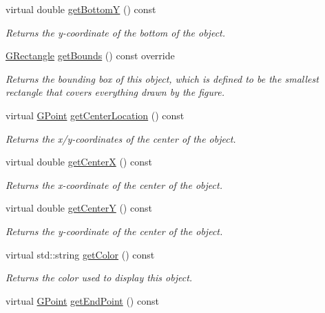 \begin{DoxyCompactItemize}
virtual double \mbox{\hyperlink{classsgl_1_1GObject_a4316a2406c18e1c6d061fe51fd355490}{get\+BottomY}} () const
\begin{DoxyCompactList}\small\item\em Returns the {\itshape y}-\/coordinate of the bottom of the object. \end{DoxyCompactList}\item 
\mbox{\hyperlink{structsgl_1_1GRectangle}{G\+Rectangle}} \mbox{\hyperlink{classsgl_1_1GArc_a89040ce9277825772d359fccd33bca86}{get\+Bounds}} () const override
\begin{DoxyCompactList}\small\item\em Returns the bounding box of this object, which is defined to be the smallest rectangle that covers everything drawn by the figure. \end{DoxyCompactList}\item 
virtual \mbox{\hyperlink{structsgl_1_1GPoint}{G\+Point}} \mbox{\hyperlink{classsgl_1_1GObject_a0909472e91448470bccdb62ecfb95d8b}{get\+Center\+Location}} () const
\begin{DoxyCompactList}\small\item\em Returns the x/y-\/coordinates of the center of the object. \end{DoxyCompactList}\item 
virtual double \mbox{\hyperlink{classsgl_1_1GObject_a04df74355b545e0543112d5b8d924176}{get\+CenterX}} () const
\begin{DoxyCompactList}\small\item\em Returns the {\itshape x}-\/coordinate of the center of the object. \end{DoxyCompactList}\item 
virtual double \mbox{\hyperlink{classsgl_1_1GObject_acb3287a3d507025a26f54b895713b947}{get\+CenterY}} () const
\begin{DoxyCompactList}\small\item\em Returns the {\itshape y}-\/coordinate of the center of the object. \end{DoxyCompactList}\item 
virtual std\+::string \mbox{\hyperlink{classsgl_1_1GObject_aa061dfa488c31e18549d64363c1d0e34}{get\+Color}} () const
\begin{DoxyCompactList}\small\item\em Returns the color used to display this object. \end{DoxyCompactList}\item 
virtual \mbox{\hyperlink{structsgl_1_1GPoint}{G\+Point}} \mbox{\hyperlink{classsgl_1_1GArc_a835d5e50bf4a91efcf0d838130c246af}{get\+End\+Point}} () const

\end{DoxyCompactItemize}
